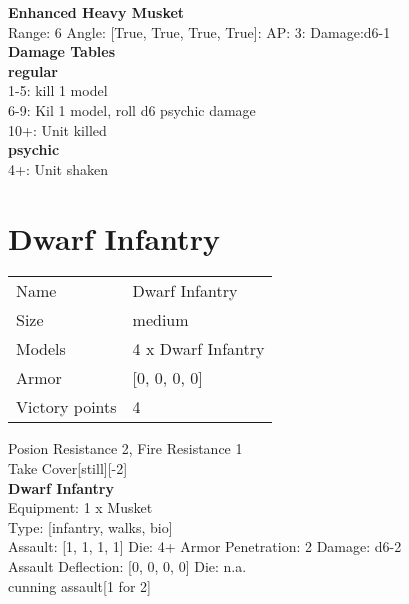 {\bf Enhanced Heavy Musket } \\



Range: 6  Angle: [True, True, True, True]: AP: 3: Damage:d6-1 \\




 





{\bf Damage Tables} \\
 {\bf regular } \\
1-5: kill 1 model \\
6-9: Kil 1 model, roll d6 psychic damage \\
10+: Unit killed \\
 {\bf psychic } \\
4+: Unit shaken \\










\pagebreak\pagebreak

\section{ Dwarf Infantry }

\begin{tabular}{ll}
  Name & Dwarf Infantry \\
  Size & medium\\
  Models & 4 x Dwarf Infantry\\
  Armor & [0, 0, 0, 0]\\
  Victory points & 4\\
\end{tabular}

Posion Resistance 2, Fire Resistance 1\\ 
Take Cover[still][-2]\\ 


{\bf Dwarf Infantry } \\
Equipment: 1 x Musket \\
Type: [infantry, walks, bio] \\

Assault: [1, 1, 1, 1] Die: 4+ Armor Penetration: 2 Damage: d6-2 \\
Assault Deflection: [0, 0, 0, 0] Die: n.a.\\
\indent cunning assault[1 for 2]\\ 
 



